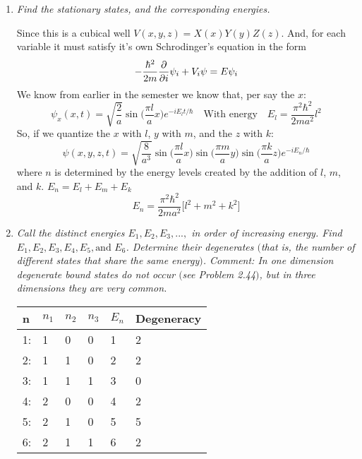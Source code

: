 \documentclass[12pt]{article}
\begin{document}
\begin{enumerate}[label=\alph*)]
\item  \emph{Find the stationary states, and the corresponding energies. }\bigskip

Since this is a cubical well $V(x,y,z) = X(x)Y(y)Z(z)$. And, for each variable it must satisfy it's own Schrodinger's equation in the form
\[-\frac{\hbar^2}{2m}\pdv{i}\psi_i + V_i \psi = E\psi_i\]
We know from earlier in the semester we know that, per say the $x$:
\[\psi_x (x,t) = \sqrt{\frac{2}{a}}\sin\Big(\frac{\pi l}{a}x\Big)e^{-iE_l t/\hbar} \quad \text{With energy} \quad E_l = \frac{\pi^2 \hbar^2}{2ma^2}l^2\]
So, if we quantize the $x$ with $l$, $y$ with $m$, and the $z$ with $k$:
\[\boxed{\psi(x,y,z,t) = \sqrt{\frac{8}{a^3}} \sin\Big(\frac{\pi l}{a}x\Big)\sin\Big(\frac{\pi m}{a}y\Big)\sin\Big(\frac{\pi k}{a}z\Big)e^{-iE_n /\hbar}}\]
where $n$ is determined by the energy levels created by the addition of $l$, $m$, and $k$. $E_n = E_l + E_m + E_k$
\[\boxed{E_n = \frac{\pi^2 \hbar^2}{2ma^2}\Big[l^2 + m^2 + k^2\Big]}\]


\item \emph{Call the distinct energies $E_1, E_2, E_3, ..., $ in order of increasing energy. Find $E_1, E_2, E_3, E_4, E_5, \text{and } E_6$. Determine their degenerates $($that is, the number of different states that share the same energy$)$. Comment: In one dimension degenerate bound states do not occur $($see Problem 2.44$)$, but in three dimensions they are very common.}\bigskip

\begin{table}[!ht]
\centering
\begin{tabular}{llll|ll}
n & $n_1$ & $n_2$ & $n_3$ & $E_n$ & Degeneracy \\ \hline
1: & 1     & 0     & 0     & 1     & 2          \\
2: & 1     & 1     & 0     & 2     & 2          \\
3: & 1     & 1     & 1     & 3     & 0          \\
4: & 2     & 0     & 0     & 4     & 2          \\
5: & 2     & 1     & 0     & 5     & 5          \\
6: & 2     & 1     & 1     & 6     & 2         
\end{tabular}
\end{table}

\end{enumerate}

\clearpage
\newpage
\end{document}
